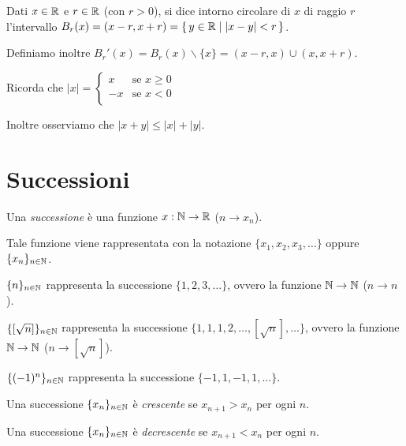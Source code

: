 \begin{definition}
Dati $x \in \mathbb R$ e $r \in \mathbb R$ (con $r > 0$), si dice intorno circolare di $x$ di raggio $r$ l'intervallo $B_r(x) = (x-r, x+r) = \set{y \in \mathbb R| |x-y| < r}$.


Definiamo inoltre $B_r'(x) = B_r(x)\backslash\{x\} = (x-r, x) \cup (x, x+r)$.
\end{definition}

Ricorda che $|x| = 
\begin{cases} 
x & \mbox{se } x \ge 0 \\
-x & \mbox{se } x < 0 \\ 
\end{cases} $

Inoltre osserviamo che $|x+y| \le |x| + |y|$.

\section{Successioni}

Una \emph{successione} è una funzione $x:\mathbb N \rightarrow \mathbb R$ ($n \rightarrow x_n$).

Tale funzione viene rappresentata con la notazione $\{x_1, x_2, x_3, \dots\}$ oppure $\{x_n\}_{n \in \mathbb N}$.

\begin{example}
$\{n\}_{n \in \mathbb N}$ rappresenta la successione $\{1, 2, 3, \dots \}$, ovvero la funzione $\mathbb N \rightarrow \mathbb N$ ($n \rightarrow n$).
\end{example}

\begin{example}
$\{[\sqrt{n}]\}_{n \in \mathbb N}$ rappresenta la successione $\{1, 1, 1, 2, \dots, [\sqrt{n}], \dots \}$, ovvero la funzione $\mathbb N \rightarrow \mathbb N$ ($n \rightarrow [\sqrt{n}]$).
\end{example}

\begin{example}
$\{(-1)^n\}_{n \in \mathbb N}$ rappresenta la successione $\{-1, 1, -1, 1, \dots \}$.
\end{example}

\begin{definition}
Una successione $\{x_n\}_{n \in \mathbb N}$ è \emph{crescente} se $x_{n+1} > x_n$ per ogni $n$.
\end{definition}

\begin{definition}
Una successione $\{x_n\}_{n \in \mathbb N}$ è \emph{decrescente} se $x_{n+1} < x_n$ per ogni $n$.
\end{definition}

